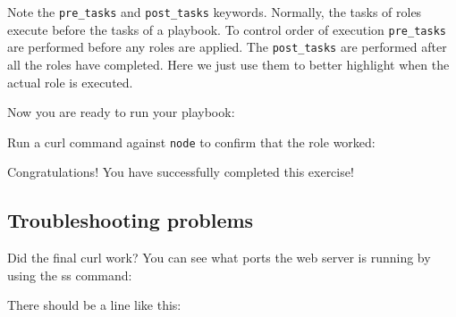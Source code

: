 Note the \texttt{pre\_tasks} and \texttt{post\_tasks} keywords.
Normally, the tasks of roles execute before the tasks of a playbook. To
control order of execution \texttt{pre\_tasks} are performed before any
roles are applied. The \texttt{post\_tasks} are performed after all the
roles have completed. Here we just use them to better highlight when the
actual role is executed.

Now you are ready to run your playbook:

\begin{Shaded}
\begin{Highlighting}[]
\ExtensionTok{[student@controller}\NormalTok{ ansible{-}files]$ ansible{-}navigator run test\_apache\_role.yml}
\end{Highlighting}
\end{Shaded}

Run a curl command against \texttt{node} to confirm that the role
worked:

\begin{Shaded}
\begin{Highlighting}[]
\ExtensionTok{[student@controller}\NormalTok{ ansible{-}files]$ curl }
\end{Highlighting}
\end{Shaded}

Congratulations! You have successfully completed this exercise!

\hypertarget{troubleshooting-problems}{%
\subsection{Troubleshooting problems}\label{troubleshooting-problems}}

Did the final curl work? You can see what ports the web server is
running by using the ss command:

\begin{Shaded}
\begin{Highlighting}[]
\end{Highlighting}
\end{Shaded}

There should be a line like this:

\begin{Shaded}
\begin{Highlighting}[]
\PreprocessorTok{*}\PreprocessorTok{*}\NormalTok{:}\PreprocessorTok{*}\ErrorTok{(}\KeywordTok{(}\KeywordTok{)}\ExtensionTok{,}\ErrorTok{(}\KeywordTok{)}\ExtensionTok{,}\ErrorTok{(}\KeywordTok{)}\ExtensionTok{,}\ErrorTok{(}\KeywordTok{))}
\end{Highlighting}
\end{Shaded}

